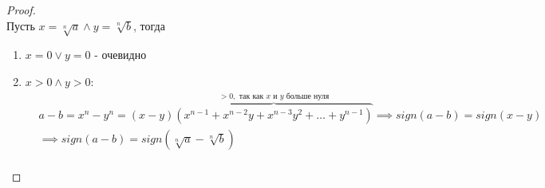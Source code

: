 \begin{proof}
    \hfill \\

    Пусть $x = \sqrt[n]{a} \land y = \sqrt[n]{b}$, тогда
    \begin{enumerate}
        \item $x = 0 \lor y = 0$ - очевидно
        \item $x > 0 \land y > 0$:
        \begin{align*}
            &a-b = x^n - y^n = (x-y)\overbrace{(x^{n-1} + x^{n-2}y + x^{n-3}y^2 + \dots + y^{n-1})}^{> 0, \text{ так как } x \text{ и } y \text{ больше нуля}}
            \implies sign(a-b) = sign(x-y) \\
            &\implies sign(a-b) = sign(\sqrt[n]{a} - \sqrt[n]{b}) \\
        \end{align*}
    \end{enumerate}
\end{proof}
